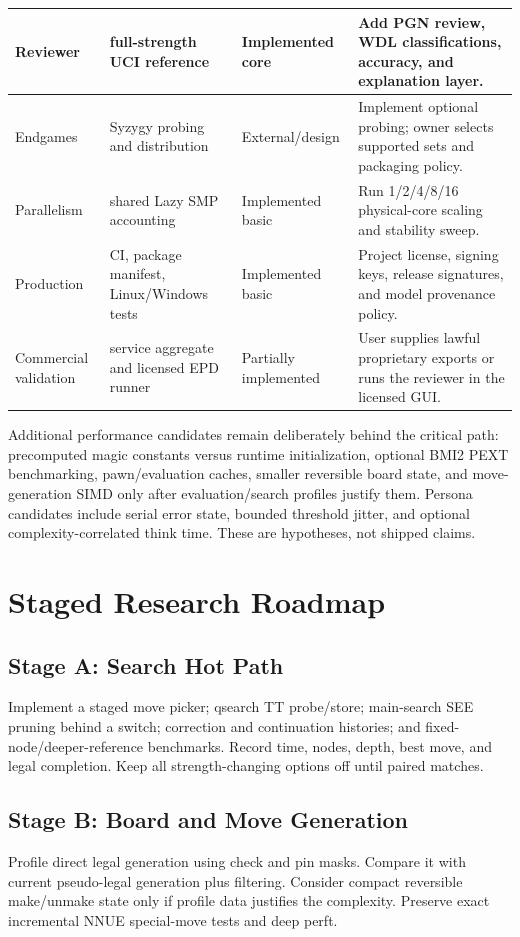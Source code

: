 \documentclass[conference]{IEEEtranSSP}
\begin{document}
\begin{table}[t]
\begin{tabular}{|p{}|p{}|p{}|p{}|}
\hline
Reviewer & full-strength UCI reference & Implemented core & Add PGN review, WDL classifications, accuracy, and explanation layer. \\
\hline
Endgames & Syzygy probing and distribution & External/design & Implement optional probing; owner selects supported sets and packaging policy. \\
\hline
Parallelism & shared Lazy SMP accounting & Implemented basic & Run 1/2/4/8/16 physical-core scaling and stability sweep. \\
\hline
Production & CI, package manifest, Linux/Windows tests & Implemented basic & Project license, signing keys, release signatures, and model provenance policy. \\
\hline
Commercial validation & service aggregate and licensed EPD runner & Partially implemented & User supplies lawful proprietary exports or runs the reviewer in the licensed GUI. \\
\hline
\end{tabular}
\end{table}

Additional performance candidates remain deliberately behind the critical path: precomputed magic constants versus runtime initialization, optional BMI2 PEXT benchmarking, pawn/evaluation caches, smaller reversible board state, and move-generation SIMD only after evaluation/search profiles justify them. Persona candidates include serial error state, bounded threshold jitter, and optional complexity-correlated think time. These are hypotheses, not shipped claims.

\section{Staged Research Roadmap}
\subsection{Stage A: Search Hot Path}
Implement a staged move picker; qsearch TT probe/store; main-search SEE pruning behind a switch; correction and continuation histories; and fixed-node/deeper-reference benchmarks. Record time, nodes, depth, best move, and legal completion. Keep all strength-changing options off until paired matches.

\subsection{Stage B: Board and Move Generation}
Profile direct legal generation using check and pin masks. Compare it with current pseudo-legal generation plus filtering. Consider compact reversible make/unmake state only if profile data justifies the complexity. Preserve exact incremental NNUE special-move tests and deep perft.
\end{document}
